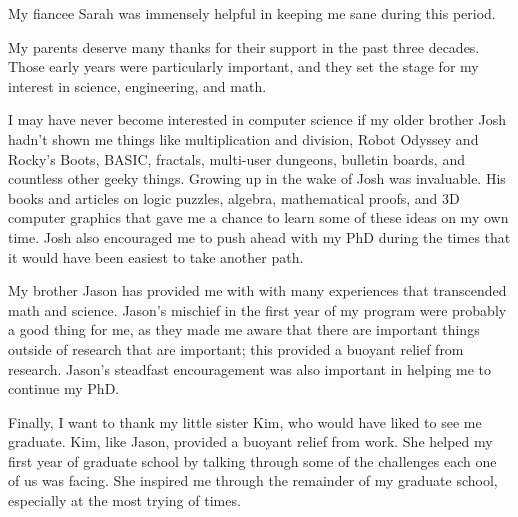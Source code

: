 My fiancee Sarah was immensely helpful in keeping me sane during this
period.

My parents deserve many thanks for their support in the past three
decades.  Those early years were particularly important, and they set
the stage for my interest in science, engineering, and math.

I may have never become interested in computer science if my older
brother Josh hadn't shown me things like multiplication and division,
Robot Odyssey and Rocky's Boots, BASIC, fractals, multi-user dungeons,
bulletin boards, and countless other geeky things.  Growing up in the
wake of Josh was invaluable.  His books and articles on logic puzzles,
algebra, mathematical proofs, and 3D computer graphics that gave me a
chance to learn some of these ideas on my own time.  Josh also
encouraged me to push ahead with my PhD during the times that it would
have been easiest to take another path.

My brother Jason has provided me with with many experiences that
transcended math and science.  Jason's mischief in the first year of
my program were probably a good thing for me, as they made me aware
that there are important things outside of research that are
important; this provided a buoyant relief from research.  Jason's
steadfast encouragement was also important in helping me to continue
my PhD.

Finally, I want to thank my little sister Kim, who would have liked to
see me graduate.  Kim, like Jason, provided a buoyant relief from work.  She
helped my first year of graduate school by talking through some of the
challenges each one of us was facing.  She inspired me through the
remainder of my graduate school, especially at the most trying of
times.
